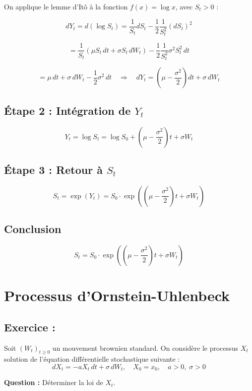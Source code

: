 On applique le lemme d'Itô à la fonction \( f(x) = \log x \), avec \( S_t > 0 \) :

\[
dY_t = d(\log S_t) = \frac{1}{S_t} dS_t - \frac{1}{2} \frac{1}{S_t^2} (dS_t)^2
\]

\[
= \frac{1}{S_t} (\mu S_t\, dt + \sigma S_t\, dW_t) - \frac{1}{2} \frac{1}{S_t^2} \sigma^2 S_t^2\, dt
\]

\[
= \mu\, dt + \sigma\, dW_t - \frac{1}{2} \sigma^2\, dt
\quad \Rightarrow \quad
dY_t = \left(\mu - \frac{\sigma^2}{2} \right) dt + \sigma\, dW_t
\]


\subsection*{Étape 2 : Intégration de \( Y_t \)}

\[
Y_t = \log S_t = \log S_0 + \left(\mu - \frac{\sigma^2}{2} \right)t + \sigma W_t
\]


\subsection*{Étape 3 : Retour à \( S_t \)}

\[
S_t = \exp(Y_t) = S_0 \cdot \exp\left( \left(\mu - \frac{\sigma^2}{2} \right)t + \sigma W_t \right)
\]


\subsection*{Conclusion}

\[
\boxed{
S_t = S_0 \cdot \exp\left( \left(\mu - \frac{\sigma^2}{2} \right)t + \sigma W_t \right)
}
\]


\section{Processus d'Ornstein-Uhlenbeck}

\subsection*{Exercice :}

\begin{exerciseBox}
Soit \( (W_t)_{t \geq 0} \) un mouvement brownien standard. On considère le processus \( X_t \) solution de l’équation différentielle stochastique suivante :
\[
dX_t = -a X_t\, dt + \sigma\, dW_t, \quad X_0 = x_0, \quad a > 0, \; \sigma > 0
\]

\textbf{Question :} Déterminer la loi  de \( X_t \).
\end{exerciseBox}

